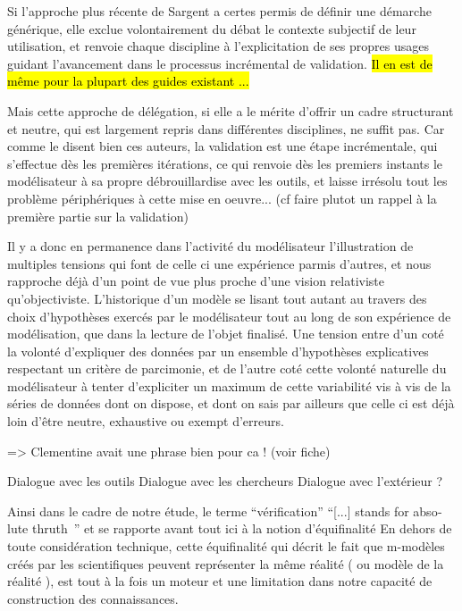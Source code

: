 Si l'approche plus récente de Sargent a certes permis de définir une démarche générique, elle exclue volontairement du débat le contexte subjectif de leur utilisation, et renvoie chaque discipline à l'explicitation de ses propres usages guidant l'avancement dans le processus incrémental de validation. \hl{Il en est de même pour la plupart des guides existant ...}

Mais cette approche de délégation, si elle a le mérite d'offrir un cadre structurant et neutre, qui est largement repris dans différentes disciplines, ne suffit pas. Car comme le disent bien ces auteurs, la validation est une étape incrémentale, qui s'effectue dès les premières itérations, ce qui renvoie dès les premiers instants le modélisateur à sa propre débrouillardise avec les outils, et laisse irrésolu tout les problème périphériques à cette mise en oeuvre... (cf faire plutot un rappel à la première partie sur la validation)

Il y a donc en permanence dans l'activité du modélisateur l'illustration de multiples tensions qui font de celle ci une expérience parmis d'autres, et nous rapproche déjà d'un point de vue plus proche d'une vision relativiste qu'objectiviste. L'historique d'un modèle se lisant tout autant au travers des choix d'hypothèses exercés par le modélisateur tout au long de son expérience de modélisation, que dans la lecture de l'objet finalisé. Une tension entre d'un coté la volonté d'expliquer des données par un ensemble d'hypothèses explicatives respectant un critère de parcimonie, et de l'autre coté cette volonté naturelle du modélisateur à tenter d'expliciter un maximum de cette variabilité vis à vis de la séries de données dont on dispose, et dont on sais par ailleurs que celle ci est déjà loin d'être neutre, exhaustive ou exempt d'erreurs.

=> Clementine avait une phrase bien pour ca ! (voir fiche)

Dialogue avec les outils
Dialogue avec les chercheurs
Dialogue avec l'extérieur
?

Ainsi dans le cadre de notre étude, le terme \enquote{vérification}  \foreignquote{english}{[...] stands for absolute thruth } \autocite{David2009} \autocite{Oreskes1994} et se rapporte avant tout ici à la notion d'équifinalité \autocite{OSullivan2004} En dehors de toute considération technique, cette équifinalité qui décrit le fait que m-modèles créés par les scientifiques peuvent représenter la même réalité ( ou modèle de la réalité ), est tout à la fois un moteur et une limitation dans notre capacité de construction des connaissances.


